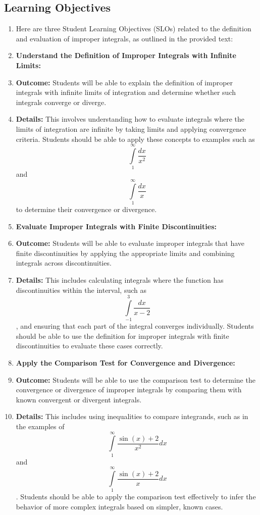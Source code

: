 \subsection{Learning Objectives}

\begin{enumerate}
    \item Here are three Student Learning Objectives (SLOs) related to the definition and evaluation of improper integrals, as outlined in the provided text:
    \item \textbf{Understand the Definition of Improper Integrals with Infinite Limits:}
    \item \textbf{Outcome:} Students will be able to explain the definition of improper integrals with infinite limits of integration and determine whether such integrals converge or diverge.
    \item \textbf{Details:} This involves understanding how to evaluate integrals where the limits of integration are infinite by taking limits and applying convergence criteria. Students should be able to apply these concepts to examples such as $$\int\limits _1^\infty \frac{dx}{x^2}$$ and $$\int\limits _1^\infty \frac{dx}{x}$$ to determine their convergence or divergence.
    \item \textbf{Evaluate Improper Integrals with Finite Discontinuities:}
    \item \textbf{Outcome:} Students will be able to evaluate improper integrals that have finite discontinuities by applying the appropriate limits and combining integrals across discontinuities.
    \item \textbf{Details:} This includes calculating integrals where the function has discontinuities within the interval, such as $$\int\limits _{-1}^3 \frac{dx}{x-2}$$, and ensuring that each part of the integral converges individually. Students should be able to use the definition for improper integrals with finite discontinuities to evaluate these cases correctly.
    \item \textbf{Apply the Comparison Test for Convergence and Divergence:}
    \item \textbf{Outcome:} Students will be able to use the comparison test to determine the convergence or divergence of improper integrals by comparing them with known convergent or divergent integrals.
    \item \textbf{Details:} This includes using inequalities to compare integrands, such as in the examples of $$\int\limits _1^\infty \frac{\sin(x)+2}{x^2}dx$$ and $$\int\limits _1^\infty \frac{\sin(x)+2}{x}dx$$. Students should be able to apply the comparison test effectively to infer the behavior of more complex integrals based on simpler, known cases.
\end{enumerate}

